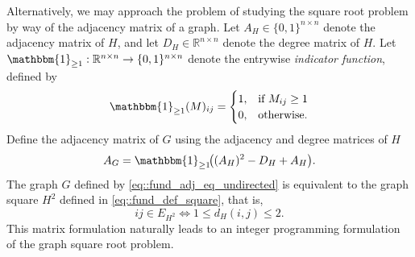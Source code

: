 \documentclass[landscape,a0paper,fontscale=0.36]{baposter} %
\begin{document}
\begin{poster}
{{Alternatively, we may approach the problem of studying the square root problem by way of the adjacency matrix of a graph. 
Let $A_H \in \{0,1\}^{n \times n}$ denote the adjacency matrix of $H$, 
and let $D_H \in \mathbb{R}^{n \times n}$ denote the degree matrix of $H$. 
Let $\mathbbm{1}_{\geq 1} : \mathbb{R}^{n \times n} \to \{0,1\}^{n \times n}$ denote the 
entrywise \emph{indicator function}, defined by
\[
\mathbbm{1}_{\geq 1}(M)_{ij} =
\begin{cases}
1 ,& \text{if } M_{ij} \geq 1 \\
0 ,& \text{otherwise}. 
\end{cases}
\]
Define the adjacency matrix of $G$ using the adjacency and degree matrices of $H$
\begin{equation} \label{eq::fund_adj_eq_undirected}
A_G = \mathbbm{1}_{\geq 1}\!\big((A_H)^2 - D_H + A_H\big).
\end{equation}
The graph $G$ defined by \eqref{eq::fund_adj_eq_undirected} is equivalent to the graph square $H^2$
 defined in \eqref{eq::fund_def_square}, that is,
\begin{equation} \label{eq::fund_def_square_expanded}
 ij \in E_{H^2} \iff 1 \leq d_H(i,j) \leq 2. 
\end{equation}
This matrix formulation naturally leads to an integer programming formulation of the graph square root problem. 
}
}
\end{poster}
\end{document}

